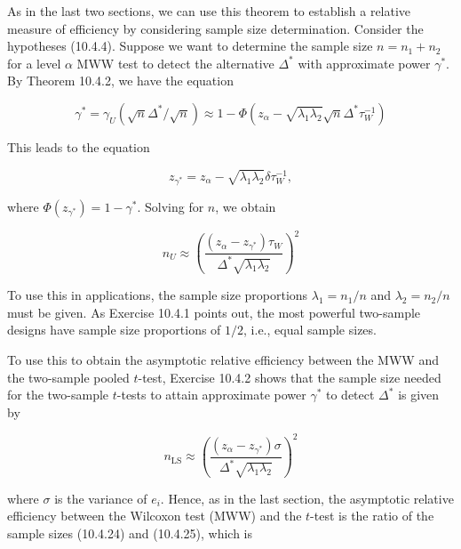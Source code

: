 As in the last two sections, we can use this theorem to establish a relative measure of efficiency by considering sample size determination. Consider the hypotheses (10.4.4). Suppose we want to determine the sample size $n=n_{1}+n_{2}$ for a level $\alpha$ MWW test to detect the alternative $\Delta^{*}$ with approximate power $\gamma^{*}$. By Theorem 10.4.2, we have the equation


\begin{equation*}
\gamma^{*}=\gamma_{U}\left(\sqrt{n} \Delta^{*} / \sqrt{n}\right) \approx 1-\Phi\left(z_{\alpha}-\sqrt{\lambda_{1} \lambda_{2}} \sqrt{n} \Delta^{*} \tau_{W}^{-1}\right) \tag{10.4.22}
\end{equation*}


This leads to the equation


\begin{equation*}
z_{\gamma^{*}}=z_{\alpha}-\sqrt{\lambda_{1} \lambda_{2}} \delta \tau_{W}^{-1}, \tag{10.4.23}
\end{equation*}


where $\Phi\left(z_{\gamma^{*}}\right)=1-\gamma^{*}$. Solving for $n$, we obtain


\begin{equation*}
n_{U} \approx\left(\frac{\left(z_{\alpha}-z_{\gamma^{*}}\right) \tau_{W}}{\Delta^{*} \sqrt{\lambda_{1} \lambda_{2}}}\right)^{2} \tag{10.4.24}
\end{equation*}


To use this in applications, the sample size proportions $\lambda_{1}=n_{1} / n$ and $\lambda_{2}=n_{2} / n$ must be given. As Exercise 10.4.1 points out, the most powerful two-sample designs have sample size proportions of $1 / 2$, i.e., equal sample sizes.

To use this to obtain the asymptotic relative efficiency between the MWW and the two-sample pooled $t$-test, Exercise 10.4.2 shows that the sample size needed for the two-sample $t$-tests to attain approximate power $\gamma^{*}$ to detect $\Delta^{*}$ is given by


\begin{equation*}
n_{\mathrm{LS}} \approx\left(\frac{\left(z_{\alpha}-z_{\gamma^{*}}\right) \sigma}{\Delta^{*} \sqrt{\lambda_{1} \lambda_{2}}}\right)^{2} \tag{10.4.25}
\end{equation*}


where $\sigma$ is the variance of $e_{i}$. Hence, as in the last section, the asymptotic relative efficiency between the Wilcoxon test (MWW) and the $t$-test is the ratio of the sample sizes (10.4.24) and (10.4.25), which is


